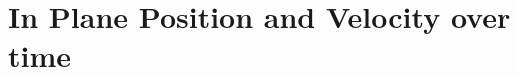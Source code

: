 \documentclass[a5paper,12pt]{book}
\begin{document}
\section{In Plane Position and Velocity over time}

\clearpage

%

%

%

%
\end{document}

